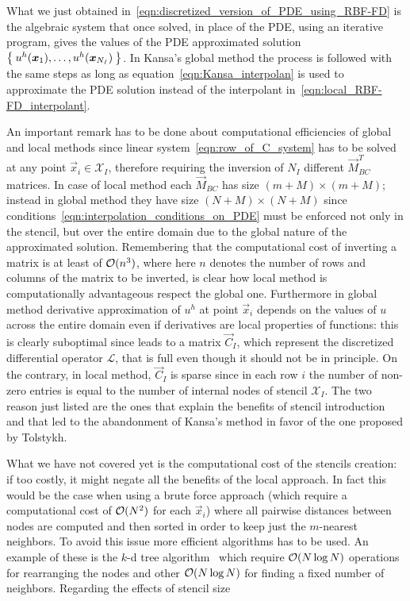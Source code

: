 What we just obtained in~\eqref{eqn:discretized_version_of_PDE_using_RBF-FD} is the algebraic system that once solved, in place of the PDE, using an iterative program, gives the values of the PDE approximated solution $\Set{u^h(\boldsymbol{x}_1), \dots, u^h(\boldsymbol{x}_{N_I})}$. In Kansa's global method the process is followed with the same steps as long as equation~\eqref{eqn:Kansa_interpolan} is used to approximate the PDE solution instead of the interpolant in~\eqref{eqn:local_RBF-FD_interpolant}.

\bigskip
An important remark has to be done about computational efficiencies of global and local methods since linear system~\eqref{eqn:row_of_C_system} has to be solved at any point $\vec{x}_i \in \mathcal{X}_I$, therefore requiring the inversion of $N_I$ different $\vec{M}_{BC}^T$ matrices. In case of local method each $\vec{M}_{BC}$ has size $(m+M) \times (m+M)$; instead in global method they have size $(N+M) \times (N+M)$ since conditions~\eqref{eqn:interpolation_conditions_on_PDE} must be enforced not only in the stencil, but over the entire domain due to the global nature of the approximated solution. Remembering that the computational cost of inverting a matrix is at least of $\mathcal{O}(n^3)$, where here $n$ denotes the number of rows and columns of the matrix to be inverted, is clear how local method is computationally advantageous respect the global one.
Furthermore in global method derivative approximation of $u^h$ at point $\vec{x}_i$ depends on the values of $u$ across the entire domain even if derivatives are local properties of functions: this is clearly suboptimal since leads to a matrix $\vec{C}_I$, which represent the discretized differential operator $\mathcal{L}$, that is full even though it should not be in principle. On the contrary, in local method, $\vec{C}_I$ is sparse since in each row $i$ the number of non-zero entries is equal to the number of internal nodes of stencil $\mathcal{X}_I$.
The two reason just listed are the ones that explain the benefits of stencil introduction and that led to the abandonment of Kansa's method in favor of the one proposed by Tolstykh.

What we have not covered yet is the computational cost of the stencils creation: if too costly, it might negate all the benefits of the local approach. In fact this would be the case when using a brute force approach (which require a computational cost of $\mathcal{O}(N^2)$ for each $\vec{x}_i$) where all pairwise distances between nodes are computed and then sorted in order to keep just the $m$-nearest neighbors. To avoid this issue more efficient algorithms has to be used. An example of these is the $k$-d tree algorithm~\cite{Bentley:k-d_tree} which require $\mathcal{O}(N \log N)$ operations for rearranging the nodes and other $\mathcal{O}(N \log N)$ for finding a fixed number of neighbors. Regarding the effects of stencil size 

